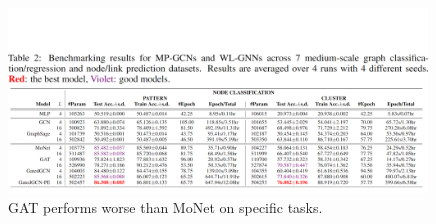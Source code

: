 \begin{figure}[h]
    \centering
    \includegraphics[width=0.99\textwidth]{img/benchmark_gat_worse.PNG}
    \caption{GAT performs worse than MoNet on specific tasks. \cite{dwivedi2020benchmarking}}
    \label{fig:gat_benchmark}
\end{figure}